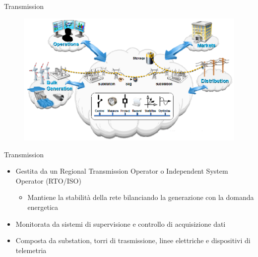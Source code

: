 \begin{frame}[fragile]{Transmission}
	\begin{figure}[h] 
		\includegraphics[scale=0.45]{imgs/tras.png}
	\end{figure}
\end{frame}

\begin{frame}[fragile]{Transmission}
	\begin{itemize}[<+- | alert@+>]
		\item Gestita da un Regional Transmission Operator o Independent System Operator (RTO/ISO)
			\begin{itemize}
				\item Mantiene la stabilità della rete bilanciando la generazione con la domanda energetica
			\end{itemize}				
		\item Monitorata da sistemi di supervisione e controllo di acquisizione dati
		\item Composta da substation, torri di trasmissione, linee elettriche e dispositivi di telemetria	 
	\end{itemize}
\end{frame}

